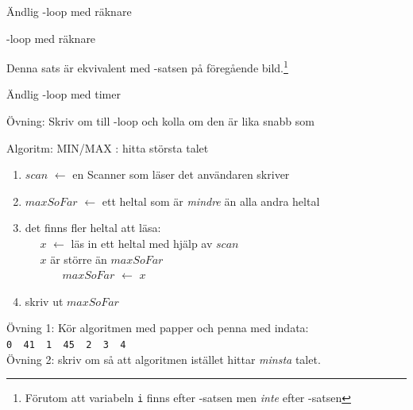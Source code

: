 \documentclass{lecturenotes}
\begin{document}
\begin{Slide}{Ändlig -loop med räknare}

\end{Slide}


\begin{Slide}{-loop med räknare}

Denna sats är ekvivalent med -satsen på föregående bild.\footnote{\scriptsize Förutom att variabeln \texttt{i} finns efter -satsen men \textit{inte} efter -satsen }
\end{Slide}

\begin{Slide}{Ändlig -loop med timer}

\scriptsize 
Övning: Skriv om till -loop och kolla om den är lika snabb som 
\end{Slide}

\begin{Slide}{Algoritm: MIN/MAX}
: hitta största talet \\ \vspace{1em}
\pause
{} 
\begin{enumerate}
\item $scan$ $\leftarrow$ en Scanner som läser det användaren skriver
\item $maxSoFar$ $\leftarrow$ ett heltal som är \textit{mindre} än alla andra heltal
\item  {} det finns fler heltal att läsa: \\
~~ $x$ $\leftarrow$ läs in ett heltal med hjälp av $scan$ \\
~~  $x$ är större än $maxSoFar$ \\
~~~~~~ $maxSoFar$ $\leftarrow$ $x$
\item skriv ut $maxSoFar$ 
\end{enumerate}
\vspace{1em} \scriptsize 
Övning 1: Kör algoritmen med papper och penna med indata: \texttt{0~~41~~1~~45~~2~~3~~4}\\ 
Övning 2: skriv om så att algoritmen istället hittar \textit{minsta} talet.
\end{Slide}
\end{document}
